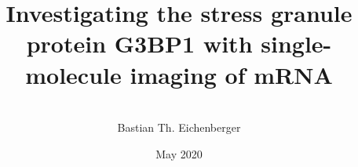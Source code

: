 \documentclass{masterthesis}
\title{Investigating the stress granule protein G3BP1 with single-molecule imaging of mRNA}
\author{\\Bastian Th. Eichenberger}
\date{May 2020}
\begin{document}
\maketitle
\makefrontmatter






\clearpage
\makebibliography

\begin{appendices}


\end{appendices}
\end{document}
